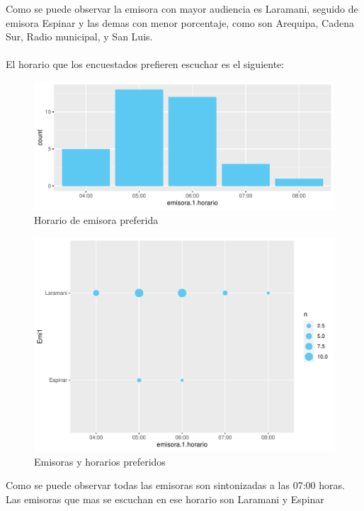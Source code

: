 \documentclass[12pt]{article}\usepackage[]{graphicx}\usepackage[]{xcolor}
\makeatletter
\def\maxwidth{ %
  \ifdim\Gin@nat@width>\linewidth
    \linewidth
  \else
    \Gin@nat@width
  \fi
}
\newenvironment{knitrout}{}{} %
\makeatother
\begin{document}
	Como se puede observar la emisora con mayor audiencia es Laramani, seguido de emisora Espinar y las demas con menor porcentaje, como son Arequipa, Cadena Sur, Radio municipal, y San Luis.\\
	\\
	El horario que los encuestados prefieren escuchar es el siguiente:
	\begin{figure}[H]
	\centering
\begin{knitrout}
\color{fgcolor}
\includegraphics[width=\maxwidth]{figure/two-1} 
\end{knitrout}
	\caption{Horario de emisora preferida}
	\end{figure}
	
	\begin{figure}[H]
	\centering
\begin{knitrout}
\color{fgcolor}
\includegraphics[width=\maxwidth]{figure/three-1} 
\end{knitrout}
	\caption{Emisoras y horarios preferidos}
	\end{figure}
	Como se puede observar todas las emisoras son sintonizadas a las 07:00 horas. Las emisoras que mas se escuchan en ese horario son Laramani y Espinar\\
	\\
	
\end{document}
